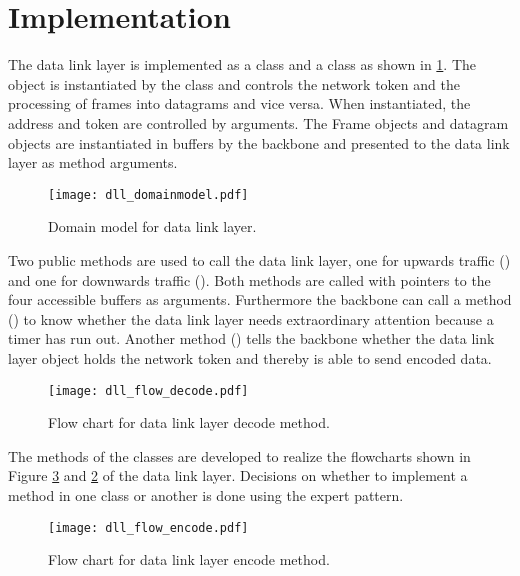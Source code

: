 \section{Implementation}
The data link layer is implemented as a  class and a
 class as shown in \ref{fig:class_diag_for_datalink}. The
 object is instantiated by the  class and
controls the network token and the processing of frames into datagrams and vice
versa. When instantiated, the address and token are controlled by arguments. The
Frame objects and datagram objects are instantiated in buffers by the backbone
and presented to the data link layer as method arguments.

\begin{figure}[htb]
	\centering
	\texttt{[image: dll\_domainmodel.pdf]}
	\caption{Domain model for data link layer.}
	\label{fig:class_diag_for_datalink}	
\end{figure}

Two public methods are used to call the data link layer, one for upwards traffic
() and one for downwards traffic (). Both methods are called with
pointers to the four accessible buffers as arguments. Furthermore the backbone
can call a method () to know whether the data link layer needs
extraordinary attention because a timer has run out. Another method
() tells the backbone whether the data link layer object holds the
network token and thereby is able to send encoded data.

\begin{figure}[htb]
	\centering
	\texttt{[image: dll\_flow\_decode.pdf]}
	\caption{Flow chart for data link layer decode method.}
	\label{fig:dll_flow_decode}	
\end{figure}

The methods of the classes are developed to realize the
flowcharts shown in Figure \ref{fig:dll_flow_encode} and
\ref{fig:dll_flow_decode} of the data link layer. Decisions on whether to implement a method in one class or another is done using the expert pattern.

\begin{figure}[htb]
	\begin{center}
	\texttt{[image: dll\_flow\_encode.pdf]}
	\caption{Flow chart for data link layer encode method.}
	\label{fig:dll_flow_encode}	
	\end{center}
\end{figure}

